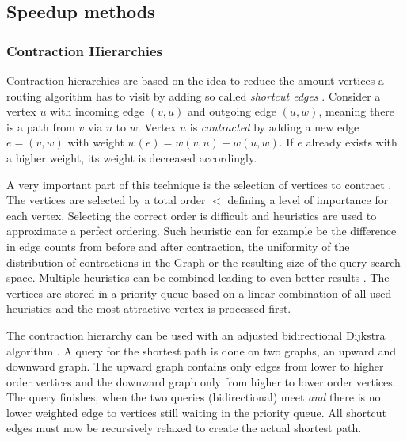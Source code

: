 	\subsection{Speedup methods}
	\label{subsec:speedup-methods}
		
		\subsubsection{Contraction Hierarchies}
		\label{subsubsec:ch}
		
			Contraction hierarchies are based on the idea to reduce the amount vertices a routing algorithm has to visit by adding so called \emph{shortcut edges} \cite{geisberger-contraction-hierarchies}.
			Consider a vertex $u$ with incoming edge $(v, u)$ and outgoing edge $(u, w)$, meaning there is a path from $v$ via $u$ to $w$.
			Vertex $u$ is \emph{contracted} by adding a new edge $e = (v, w)$ with weight $w(e) = w(v, u) + w(u, w)$.
			If $e$ already exists with a higher weight, its weight is decreased accordingly.
			
			A very important part of this technique is the selection of vertices to contract \cite[14]{geisberger-contraction-hierarchies}.
			The vertices are selected by a total order $<$ defining a level of importance for each vertex.
			Selecting the correct order is difficult and heuristics are used to approximate a perfect ordering.
			Such heuristic can for example be the difference in edge counts from before and after contraction, the uniformity of the distribution of contractions in the Graph or the resulting size of the query search space.
			Multiple heuristics can be combined leading to even better results \cite[49]{geisberger-contraction-hierarchies}.
			The vertices are stored in a priority queue based on a linear combination of all used heuristics and the most attractive vertex is processed first.
			
			The contraction hierarchy can be used with an adjusted bidirectional Dijkstra algorithm \cite[29-30]{geisberger-contraction-hierarchies}.
			A query for the shortest path is done on two graphs, an upward and downward graph.
			The upward graph contains only edges from lower to higher order vertices and the downward graph only from higher to lower order vertices.
			The query finishes, when the two queries (bidirectional) meet \emph{and} there is no lower weighted edge to vertices still waiting in the priority queue.
			All shortcut edges must now be recursively relaxed to create the actual shortest path.
		
